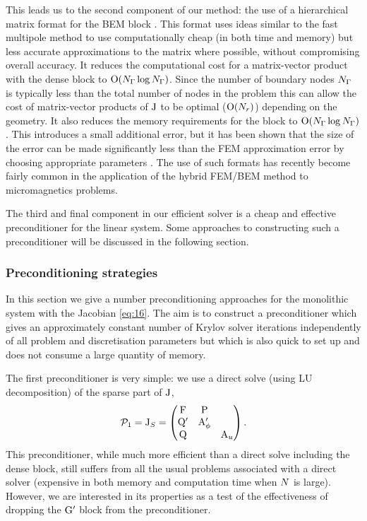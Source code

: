 This leads us to the second component of our method: the use of a hierarchical matrix format for the BEM block \cite{Borm2003,Forster2003,Knittel2011}.
This format uses ideas similar to the fast multipole method to use computationally cheap (in both time and memory) but less accurate approximations to the matrix where possible, without compromising overall accuracy.
It reduces the computational cost for a matrix-vector product with the dense block to $\mathrm{O}{\left( N_{\Gamma} \log N_{\Gamma} \right)}$.
Since the number of boundary nodes $N_{\Gamma}$ is typically less than the total number of nodes in the problem this can allow the cost of matrix-vector products of $\mathrm{J}$ to be optimal (\ie $\mathrm{O}{\left( N_r \right)}$) depending on the geometry.
It also reduces the memory requirements for the block to $\mathrm{O}{\left( N_{\Gamma} \log N_{\Gamma} \right)}$.
This introduces a small additional error, but it has been shown that the size of the error can be made significantly less than the FEM approximation error by choosing appropriate parameters \cite[77]{Knittel2011}.
The use of such formats has recently become fairly common in the application of the hybrid FEM/BEM method to micromagnetics problems.

The third and final component in our efficient solver is a cheap and effective preconditioner for the linear system.
Some approaches to constructing such a preconditioner will be discussed in the following section.


\subsubsection{Preconditioning strategies}
\label{sec:bem-solver-strategies}


In this section we give a number preconditioning approaches for the monolithic system with the Jacobian \cref{eq:16}.
The aim is to construct a preconditioner which gives an approximately constant number of Krylov solver iterations independently of all problem and discretisation parameters but which is also quick to set up and does not consume a large quantity of memory.

The first preconditioner is very simple: we use a direct solve (using LU decomposition) of the sparse part of $\mathrm{J}$, \ie
\begin{equation}
  \mathcal{P}_1 = \mathrm{J}_S =
  \begin{pmatrix}
    \mathrm{F}       & \mathrm{P}     &  \\
    \mathrm{Q}'       & \mathrm{A}_\phi'    &   \\
    \mathrm{Q}       &         &   \mathrm{A}_u
  \end{pmatrix}.
\label{eq:90}
\end{equation}
This preconditioner, while much more efficient than a direct solve including the dense block, still suffers from all the usual problems associated with a direct solver (\ie expensive in both memory and computation time when $N$ is large).
However, we are interested in its properties as a test of the effectiveness of dropping the $\mathrm{G}'$ block from the preconditioner.

